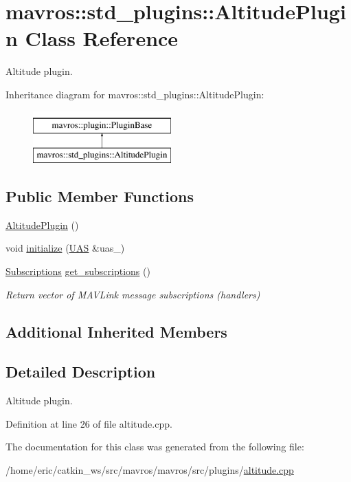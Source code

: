 \hypertarget{classmavros_1_1std__plugins_1_1AltitudePlugin}{}\section{mavros\+::std\+\_\+plugins\+::Altitude\+Plugin Class Reference}
\label{classmavros_1_1std__plugins_1_1AltitudePlugin}


Altitude plugin.  


Inheritance diagram for mavros\+::std\+\_\+plugins\+::Altitude\+Plugin\+:\begin{figure}[H]
\begin{center}
\leavevmode
\includegraphics[height=2.000000cm]{classmavros_1_1std__plugins_1_1AltitudePlugin}
\end{center}
\end{figure}
\subsection*{Public Member Functions}
\begin{DoxyCompactItemize}
\item 
\mbox{\hyperlink{group__plugin_gadbc07fbf84dc0c7445f72271e672e0c6}{Altitude\+Plugin}} ()
\item 
void \mbox{\hyperlink{group__plugin_ga5aeb9ab8ababf66ba15c0bf2705c6162}{initialize}} (\mbox{\hyperlink{classmavros_1_1UAS}{U\+AS}} \&uas\+\_\+)
\item 
\mbox{\hyperlink{group__plugin_ga8967d61fc77040e0c3ea5a4585d62a09}{Subscriptions}} \mbox{\hyperlink{group__plugin_gafd32c19f38dc1c1c634d9090b3319af6}{get\+\_\+subscriptions}} ()
\begin{DoxyCompactList}\small\item\em Return vector of M\+A\+V\+Link message subscriptions (handlers) \end{DoxyCompactList}\end{DoxyCompactItemize}
\subsection*{Additional Inherited Members}


\subsection{Detailed Description}
Altitude plugin. 

Definition at line 26 of file altitude.\+cpp.



The documentation for this class was generated from the following file\+:\begin{DoxyCompactItemize}
\item 
/home/eric/catkin\+\_\+ws/src/mavros/mavros/src/plugins/\mbox{\hyperlink{altitude_8cpp}{altitude.\+cpp}}\end{DoxyCompactItemize}
